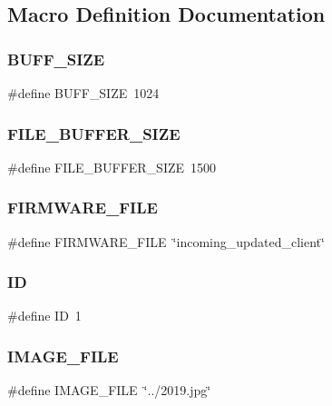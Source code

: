 \subsection{Macro Definition Documentation}
\mbox{\label{client_2main_8c_a6c7cd32e1bac137f05e4a752b4ad10af}} 
\subsubsection{BUFF\_SIZE}
{\footnotesize\ttfamily \#define B\+U\+F\+F\+\_\+\+S\+I\+ZE~1024}

\mbox{\label{client_2main_8c_a09dbbd73a84cf772b421c6024b65b1fd}} 
\subsubsection{FILE\_BUFFER\_SIZE}
{\footnotesize\ttfamily \#define F\+I\+L\+E\+\_\+\+B\+U\+F\+F\+E\+R\+\_\+\+S\+I\+ZE~1500}

\mbox{\label{client_2main_8c_a6ef7baa1d4325116155fe508770ec911}} 
\subsubsection{FIRMWARE\_FILE}
{\footnotesize\ttfamily \#define F\+I\+R\+M\+W\+A\+R\+E\+\_\+\+F\+I\+LE~\char`\"{}incoming\+\_\+updated\+\_\+client\char`\"{}}

\mbox{\label{client_2main_8c_a77ceac8d6af195fe72f95f6afd87c45e}} 
\subsubsection{ID}
{\footnotesize\ttfamily \#define ID~1}

\mbox{\label{client_2main_8c_ade64ea695c038c15864c1e6fd5d69c03}} 
\subsubsection{IMAGE\_FILE}
{\footnotesize\ttfamily \#define I\+M\+A\+G\+E\+\_\+\+F\+I\+LE~\char`\"{}../2019.jpg\char`\"{}}



